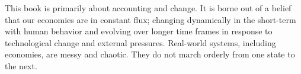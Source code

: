 

This book is primarily about accounting and change.
It is borne out of a belief that our economies are in constant flux;
changing dynamically in the short-term with human behavior
and evolving over longer time frames 
in response to technological change and
external pressures.
Real-world systems, including economies, are messy and chaotic.
They do not march orderly from one state to the next.

% 
%



